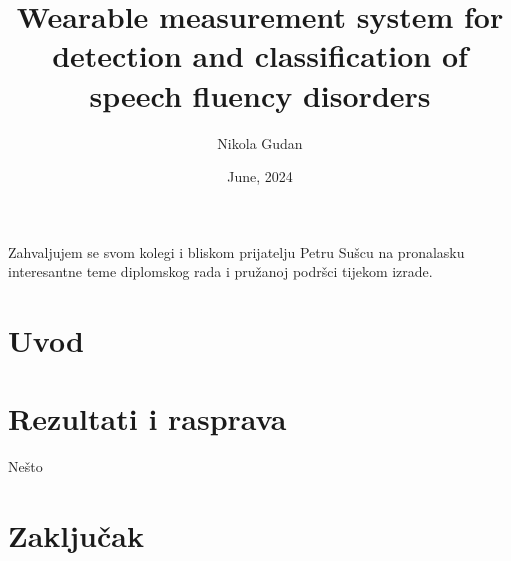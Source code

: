\documentclass[diplomskirad]{fer}
\title{Wearable measurement system for detection and classification of speech fluency disorders}
\author{Nikola Gudan}
\date{June, 2024}
\begin{document}
\maketitle






\begin{zahvale}
  Zahvaljujem se svom kolegi i bliskom prijatelju Petru Sušcu na pronalasku interesantne teme diplomskog rada i pružanoj podršci tijekom izrade.
\end{zahvale}


\mainmatter


\tableofcontents


%
\chapter{Uvod}
\label{pog:uvod}




\chapter{Rezultati i rasprava}
\label{pog:rezultati_i_rasprava}

Nešto


\chapter{Zaključak}
\label{pog:zakljucak}
\end{document}
